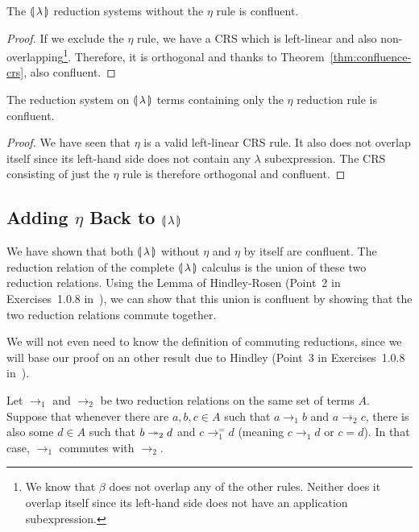 \begin{lemma}\label{lem:confluence-int}

  The $\llparenthesis \, \lambda \, \rrparenthesis$ reduction systems without the $\eta$ rule is
  confluent.
\end{lemma}

\begin{proof}
  If we exclude the $\eta$ rule, we have a CRS which is left-linear and
  also non-overlapping\footnote{We know that $\beta$ does not overlap
    any of the other rules. Neither does it overlap itself since its
    left-hand side does not have an application subexpression.}. Therefore,
  it is orthogonal and thanks to Theorem~\ref{thm:confluence-crs}, also
  confluent.
\end{proof}

\begin{lemma}\label{lem:confluence-eta}

  The reduction system on $\llparenthesis \, \lambda \, \rrparenthesis$ terms containing only the
  $\eta$ reduction rule is confluent.
\end{lemma}

\begin{proof}
  We have seen that $\eta$ is a valid left-linear CRS rule. It also
  does not overlap itself since its left-hand side does not contain any
  $\lambda$ subexpression. The CRS consisting of just the $\eta$ rule
  is therefore orthogonal and confluent.
\end{proof}


\subsection{Adding $\eta$ Back to $\llparenthesis \, \lambda \, \rrparenthesis$}

We have shown that both $\llparenthesis \, \lambda \, \rrparenthesis$ without $\eta$ and
$\eta$ by itself are confluent. The reduction relation of the complete
$\llparenthesis \, \lambda \, \rrparenthesis$ calculus is the union of these two reduction
relations. Using the Lemma of Hindley-Rosen (Point~2 in Exercises~1.0.8
in~\cite{klop1992term}), we can show that this union is confluent by
showing that the two reduction relations commute together.

We will not even need to know the definition of commuting reductions, since
we will base our proof on an other result due to Hindley (Point~3 in
Exercises~1.0.8 in~\cite{klop1992term}).

\begin{lemma}\label{lem:commutativity}
  Let $\to_1$ and $\to_2$ be two reduction relations on the same set of
  terms $A$. Suppose that whenever there are $a,b,c \in A$ such that
  $a \to_1 b$ and $a \to_2 c$, there is also some $d \in A$ such that
  $b \twoheadrightarrow_2 d$ and $c \to_1^= d$ (meaning $c \to_1 d$ or $c = d$). In that
  case, $\to_1$ commutes with $\to_2$.
\end{lemma}

